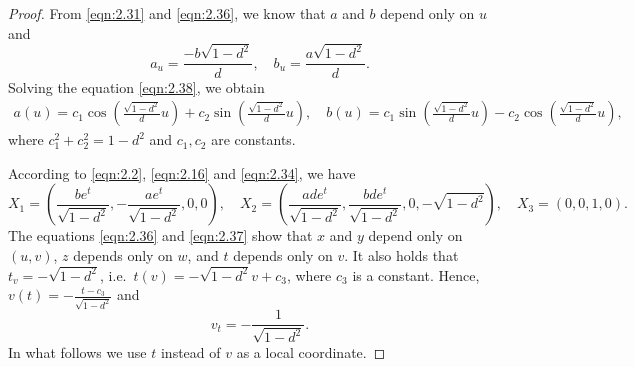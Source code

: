 \documentclass[reqno]{amsart}%
\theoremstyle{definition}
\numberwithin{equation}{section}
\begin{document}
\begin{proof}
		From \eqref{eqn:2.31} and \eqref{eqn:2.36}, we know
		that $a$ and $b$ depend only on $u$ and
		\begin{equation}\label{eqn:2.38}
			a_u=\frac{-b\sqrt{1-d^2}}{d}, \quad b_u=\frac{a\sqrt{1-d^2}}{d}.
		\end{equation}
		Solving the equation \eqref{eqn:2.38}, we obtain
		\begin{equation}\label{eqn:2.39}
			\begin{aligned}
				a(u)=c_1\cos\left(\tfrac{\sqrt{1-d^2}}{d}u\right)+c_2\sin\left(\tfrac{\sqrt{1-d^2}}{d}u\right), \quad
				b(u)=c_1\sin\left(\tfrac{\sqrt{1-d^2}}{d}u\right)-c_2\cos\left(\tfrac{\sqrt{1-d^2}}{d}u\right),
			\end{aligned}
		\end{equation}
		where $c_1^2+c_2^2=1-d^2$ and $c_1, c_2$ are constants.
		
		According to \eqref{eqn:2.2}, \eqref{eqn:2.16} and \eqref{eqn:2.34}, we have
		\begin{equation}\label{eqn:2.37}
			X_1= \left(\frac{be^t}{\sqrt{1-d^2}},-\frac{ae^t}{\sqrt{1-d^2}},0,0\right),\quad
			X_2= \left(\frac{ade^t}{\sqrt{1-d^2}},\frac{bde^t}{\sqrt{1-d^2}},0,-\sqrt{1-d^2}\right),\quad
			X_3= \left(0,0,1,0\right).
		\end{equation}
		The equations \eqref{eqn:2.36} and \eqref{eqn:2.37} show that
		$x$ and $y$ depend only on $(u,v)$, $z$ depends only on $w$,
		and $t$ depends only on $v$.
		It also holds that $t_v=-\sqrt{1-d^2}$, i.e.\ $t(v)=-\sqrt{1-d^2}v+c_3$, where $c_3$ is a constant.
		Hence, $v(t)=-\tfrac{t-c_3}{\sqrt{1-d^2}}$ and
		\begin{equation}\label{eqn:2.40}
			v_t=-\frac{1}{\sqrt{1-d^2}}.
		\end{equation}
		In what follows we use $t$ instead of $v$ as a local coordinate.
		

\end{proof}
\end{document}
